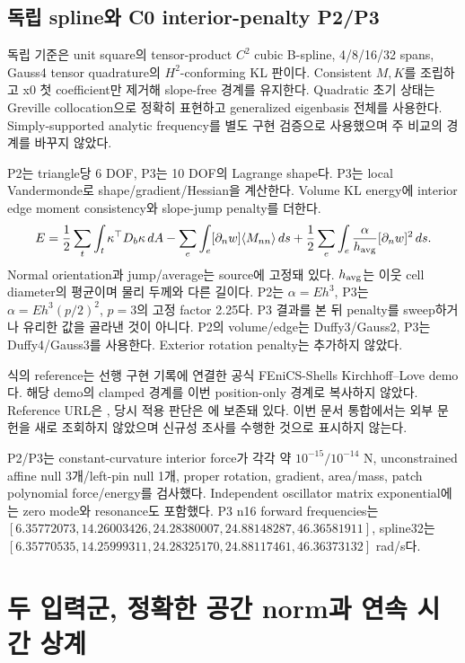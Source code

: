 \documentclass[10pt]{article}
\begin{document}
\subsection{독립 spline와 C0 interior-penalty P2/P3}

독립 기준은 unit square의 tensor-product \(C^2\) cubic B-spline, 4/8/16/32 spans,
Gauss4 tensor quadrature의 \(H^2\)-conforming KL 판이다. Consistent \(M,K\)를 조립하고
x0 첫 coefficient만 제거해 slope-free 경계를 유지한다. Quadratic 초기 상태는 Greville collocation으로
정확히 표현하고 generalized eigenbasis 전체를 사용한다.
Simply-supported analytic frequency를 별도 구현 검증으로 사용했으며 주 비교의 경계를 바꾸지 않았다.

P2는 triangle당 6 DOF, P3는 10 DOF의 Lagrange shape다. P3는 local Vandermonde로 shape/gradient/Hessian을
계산한다. Volume KL energy에 interior edge moment consistency와 slope-jump penalty를 더한다.
\[
 E=\frac12\sum_t\int_t\kappa^\top D_b\kappa\,dA
 -\sum_e\int_e[\partial_n w]\langle M_{nn}\rangle\,ds
 +\frac12\sum_e\int_e\frac{\alpha}{h_{\rm avg}}[\partial_n w]^2\,ds.
\]
Normal orientation과 jump/average는 source에 고정돼 있다.
\(h_{\rm avg}\)는 이웃 cell diameter의 평균이며 물리 두께와 다른 길이다.
P2는 \(\alpha=Eh^3\), P3는 \(\alpha=Eh^3(p/2)^2\), \(p=3\)의 고정 factor 2.25다.
P3 결과를 본 뒤 penalty를 sweep하거나 유리한 값을 골라낸 것이 아니다.
P2의 volume/edge는 Duffy3/Gauss2, P3는 Duffy4/Gauss3를 사용한다.
Exterior rotation penalty는 추가하지 않았다.

식의 reference는 선행 구현 기록에 연결한 공식 FEniCS-Shells Kirchhoff--Love demo다.
해당 demo의 clamped 경계를 이번 position-only 경계로 복사하지 않았다.
Reference URL은 , 당시 적용 판단은
에 보존돼 있다.
이번 문서 통합에서는 외부 문헌을 새로 조회하지 않았으며 신규성 조사를 수행한 것으로 표시하지 않는다.

P2/P3는 constant-curvature interior force가 각각 약 \(10^{-15}/10^{-14}\) N,
unconstrained affine null 3개/left-pin null 1개, proper rotation, gradient, area/mass,
patch polynomial force/energy를 검사했다.
Independent oscillator matrix exponential에는 zero mode와 resonance도 포함했다.
P3 n16 forward frequencies는
\([6.35772073,14.26003426,24.28380007,24.88148287,46.36581911]\),
spline32는 \([6.35770535,14.25999311,24.28325170,24.88117461,46.36373132]\) rad/s다.

\section{두 입력군, 정확한 공간 norm과 연속 시간 상계}
\end{document}
